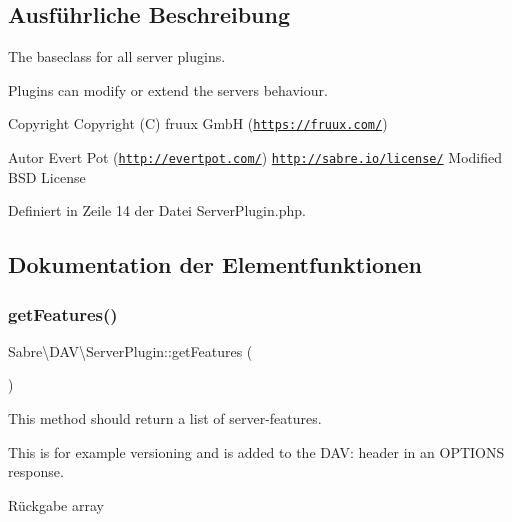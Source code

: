 \subsection{Ausführliche Beschreibung}
The baseclass for all server plugins.

Plugins can modify or extend the servers behaviour.

\begin{DoxyCopyright}{Copyright}
Copyright (C) fruux GmbH (\href{https://fruux.com/}{\tt https\+://fruux.\+com/}) 
\end{DoxyCopyright}
\begin{DoxyAuthor}{Autor}
Evert Pot (\href{http://evertpot.com/}{\tt http\+://evertpot.\+com/})  \href{http://sabre.io/license/}{\tt http\+://sabre.\+io/license/} Modified B\+SD License 
\end{DoxyAuthor}


Definiert in Zeile 14 der Datei Server\+Plugin.\+php.



\subsection{Dokumentation der Elementfunktionen}
\mbox{\label{class_sabre_1_1_d_a_v_1_1_server_plugin_a8681879236fa589ad92f0614682f28a7}} 
\subsubsection{\texorpdfstring{get\+Features()}{getFeatures()}}
{\footnotesize\ttfamily Sabre\textbackslash{}\+D\+A\+V\textbackslash{}\+Server\+Plugin\+::get\+Features (\begin{DoxyParamCaption}{ }\end{DoxyParamCaption})}

This method should return a list of server-\/features.

This is for example \textquotesingle{}versioning\textquotesingle{} and is added to the D\+AV\+: header in an O\+P\+T\+I\+O\+NS response.

\begin{DoxyReturn}{Rückgabe}
array 
\end{DoxyReturn}


